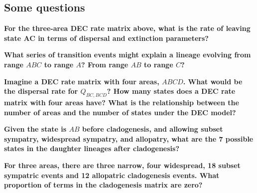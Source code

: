 
\subsection*{Some questions}

{\bf {} For the three-area DEC rate matrix above, what is the rate of leaving state AC in terms of dispersal and extinction parameters?}

{\bf {} What series of transition events might explain a lineage evolving from range $ABC$ to range $A$? From range $AB$ to range $C$?}

{ \bf {} Imagine a DEC rate matrix with four areas, $ABCD$. What would be the dispersal rate for $Q_{BC,BCD}$? How many states does a DEC rate matrix with four areas have? What is the relationship between the number of areas and the number of states under the DEC model? }

{\bf {} Given the state is $AB$ before cladogenesis, and allowing subset sympatry, widespread sympatry, and allopatry, what are the 7 possible states in the daughter lineages after cladogenesis?}

{\bf {} For three areas, there are three narrow, four widespread, 18 subset sympatric events and 12 allopatric cladogenesis events. What proportion of terms in the cladogenesis matrix are zero?}





\newpage

